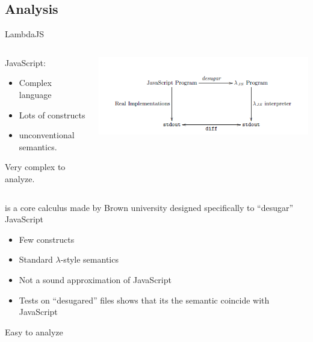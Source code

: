 \documentclass[11pt]{beamer}
\begin{document}
\subsection{Analysis}
\begin{frame}{LambdaJS \cite{LambdaJS}}
\begin{columns}[T]
\begin{column}{.48\textwidth}
JavaScript:
\begin{itemize}
\item Complex language
\item Lots of constructs
\item unconventional semantics.
\end{itemize}
Very complex to analyze.
\end{column}
\begin{column}{.50\textwidth}
\includegraphics[scale=0.42]{Images/LambdaJS.PNG}
\end{column}
\end{columns}

\ljs\cite{LambdaJS} is a core calculus made by Brown university designed specifically to ``desugar'' JavaScript
\begin{itemize}
\item Few constructs
\item Standard $\lambda$-style semantics
\item Not a sound approximation of JavaScript
\item Tests on ``desugared'' files shows that its the semantic coincide with JavaScript
\end{itemize}
Easy to analyze
\end{frame}
\end{document}
